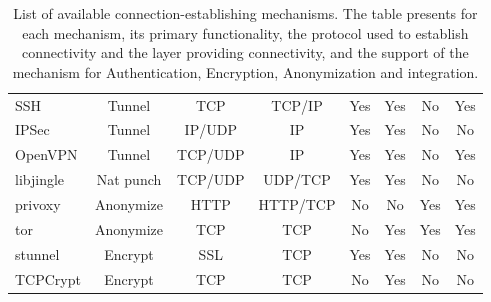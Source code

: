 \begin{table}
{\begin{tabular}{|l|c|c|c|c|c|c|c| }
SSH         & Tunnel         & TCP     & TCP/IP      & Yes    & Yes & No & Yes\\
IPSec       & Tunnel         & IP/UDP  & IP          & Yes    & Yes & No & No\\
OpenVPN     & Tunnel         & TCP/UDP & IP          & Yes    & Yes & No & Yes\\
libjingle   & Nat punch      & TCP/UDP & UDP/TCP     & Yes    & Yes & No & No\\
privoxy     & Anonymize      & HTTP    & HTTP/TCP    & No     & No  & Yes & Yes\\
tor         & Anonymize      & TCP     & TCP         & No     & Yes & Yes & Yes\\
stunnel     & Encrypt        & SSL     & TCP         & Yes    & Yes    & No & No\\
TCPCrypt    & Encrypt        & TCP     & TCP         & No     & Yes    & No & No\\
\hline
\end{tabular}
\caption[List of available connection-establishing
mechanisms.]{\label{tbl:signpost-tunnels}List of available
connection-establishing mechanisms. The table presents for each mechanism, its
primary functionality, the protocol used to establish connectivity and the
layer providing connectivity, and the support of the mechanism for
Authentication, Encryption, Anonymization and \signpost integration.}
}
\end{table}

